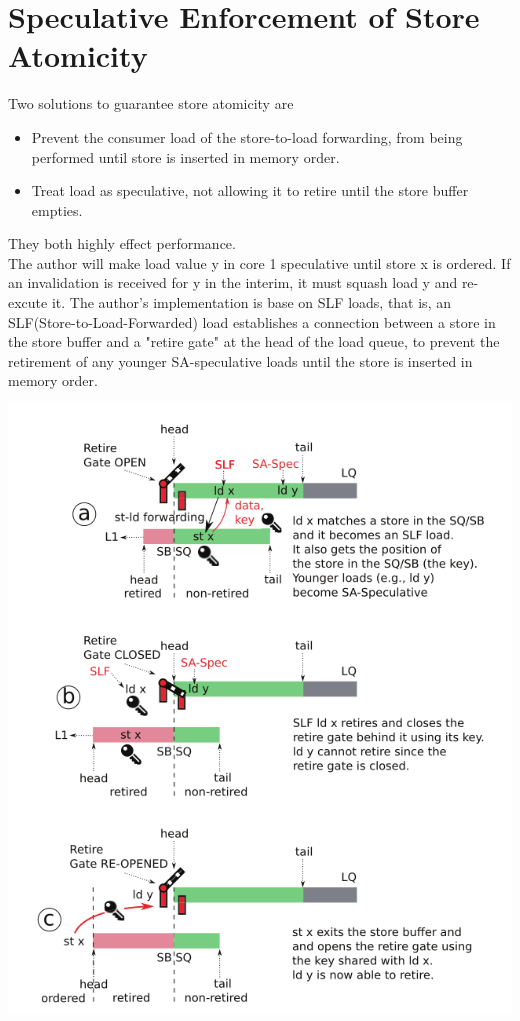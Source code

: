 \documentclass[10pt,a4paper]{article}
\begin{document}
\section{Speculative Enforcement of Store Atomicity}
Two solutions to guarantee store atomicity are
\begin{itemize}
	\item  Prevent the consumer load of the store-to-load forwarding, from being performed until store is inserted in memory order.
	\item Treat load as speculative, not allowing it to retire until the store buffer empties.
\end{itemize}
They both highly effect performance.\\
The author will make load value y in core 1 speculative until store x is ordered. If an invalidation is received for y in the interim, it must squash load y and re-excute it. The author's implementation is base on SLF loads, that is, an SLF(Store-to-Load-Forwarded) load establishes a connection between a store in the store buffer and a "retire gate" at the head of the load queue, to prevent the retirement of any younger SA-speculative loads until the store is inserted in memory order. 
\begin{center}
	\includegraphics[scale = 0.4]{3.png}
\end{center} 
\end{document}

